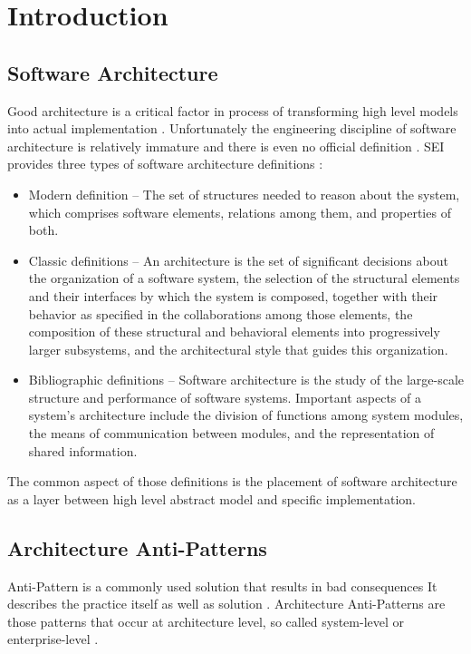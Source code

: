 \section{Introduction}


\subsection{Software Architecture}

Good architecture is a critical factor in process of transforming high level models into actual implementation \cite{Nordic}. Unfortunately the engineering discipline of software architecture is relatively immature and there is even no official definition \cite{ArchitekturaWikiPl}.
SEI provides three types of software architecture definitions \cite{SEI}:
\begin{itemize}
    \item Modern definition -- The set of structures needed to reason about the system, which comprises software elements, relations among them, and properties of both.
    \item Classic definitions -- An architecture is the set of significant decisions about the organization of a software system, the selection of the structural elements and their interfaces by which the system is composed, together with their behavior as specified in the collaborations among those elements, the composition of these structural and behavioral elements into progressively larger subsystems, and the architectural style that guides this organization.
    \item Bibliographic definitions -- Software architecture is the study of the large-scale structure and performance of software systems. Important aspects of a system's architecture include the division of functions among system modules, the means of communication between modules, and the representation of shared information.
\end{itemize}
The common aspect of those definitions is the placement of software architecture as a layer between high level abstract model and specific implementation.


\subsection{Architecture Anti-Patterns}

Anti-Pattern is a commonly used solution that results in bad consequences It describes the practice itself as well as solution \cite{PatternsAndSoftware}.
Architecture Anti-Patterns are those patterns that occur at architecture level, so called system-level or enterprise-level \cite{SurvivalGuide}.

